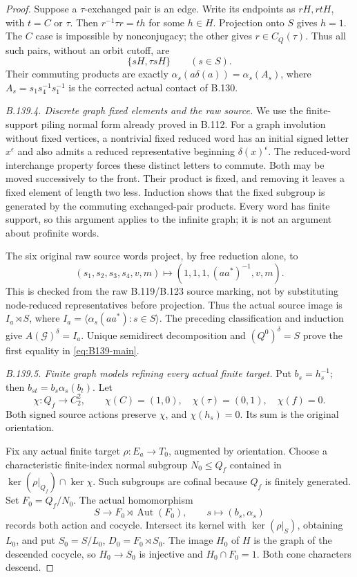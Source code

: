 \begin{proof}
Suppose a $\tau$-exchanged pair is an edge. Write its endpoints
as $rH,rtH$, with $t=C$ or $\tau$.
Then $r^{-1}\tau r=th$ for some $h\in H$.
Projection onto $S$ gives $h=1$.
The $C$ case is impossible by nonconjugacy; the other gives
$r\in C_Q(\tau)$. Thus all such pairs, without an orbit cutoff, are
\[
 \{sH,\tau sH\}\qquad(s\in S).
 \]
Their commuting products are exactly
$\alpha_s(a\delta(a))=\alpha_s(A_s)$, where
$A_s=s_1s_4^{-1}s_1^{-1}$ is the corrected actual contact of B.130.

\emph{B.139.4. Discrete graph fixed elements and the raw source.}
We use the finite-support piling normal form already proved in B.112.
For a graph involution without fixed vertices, a nontrivial fixed
reduced word has an initial signed letter $x^\epsilon$ and also
admits a reduced representative beginning
$\delta(x)^\epsilon$.
The reduced-word interchange property forces these distinct letters
to commute. Both may be moved successively to the front.
Their product is fixed, and removing it leaves a fixed element of
length two less. Induction shows that the fixed subgroup is
generated by the commuting exchanged-pair products.
Every word has finite support, so this argument applies to the
infinite graph; it is not an argument about profinite words.

The six original raw source words project, by free reduction alone, to
\begin{equation}\label{eq:B139-raw-source}
 (s_1,s_2,s_3,s_4,v,m)\longmapsto
       (1,1,1,(aa^*)^{-1},v,m).
\end{equation}
This is checked from the raw B.119/B.123 source marking, not by
substituting node-reduced representatives before projection.
Thus the actual source image is
$I_a\rtimes S$, where
$I_a=\langle\alpha_s(aa^*):s\in S\rangle$.
The preceding classification and induction give
$A(\mathcal G)^\delta=I_a$.
Unique semidirect decomposition and $(Q^0)^\delta=S$
prove the first equality in \eqref{eq:B139-main}.

\emph{B.139.5. Finite graph models refining every actual finite target.}
Put $b_s=h_s^{-1}$; then
$b_{st}=b_s\alpha_s(b_t)$.
Let
\[
 \chi:Q_f\to C_2^2,\qquad
 \chi(C)=(1,0),\quad\chi(\tau)=(0,1),\quad\chi(f)=0.
\]
Both signed source actions preserve $\chi$, and $\chi(h_s)=0$.
Its sum is the original orientation.

Fix any actual finite target $\rho:E_a\to T_0$, augmented by
orientation. Choose a characteristic finite-index normal subgroup
$N_0\leq Q_f$ contained in $\ker(\rho|_{Q_f})\cap\ker\chi$.
Such subgroups are cofinal because $Q_f$ is finitely generated.
Set $F_0=Q_f/N_0$. The actual homomorphism
\[
 S\longrightarrow F_0\rtimes\operatorname{Aut}(F_0),
       \qquad s\longmapsto(b_s,\alpha_s)
\]
records both action and cocycle. Intersect its kernel with
$\ker(\rho|_S)$, obtaining $L_0$, and put
$S_0=S/L_0$, $D_0=F_0\rtimes S_0$.
The image $H_0$ of $H$ is the graph of the descended cocycle,
so $H_0\to S_0$ is injective and $H_0\cap F_0=1$.
Both cone characters descend.


\end{proof}
